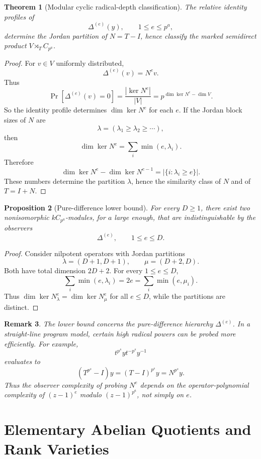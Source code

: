 \documentclass[11pt]{article}
\newtheorem{theorem}{Theorem}[section]
\newtheorem{proposition}[theorem]{Proposition}
\newtheorem{remark}[theorem]{Remark}
\begin{document}
\begin{theorem}[Modular cyclic radical-depth classification]
The relative identity profiles of
\[
\Delta^{(e)}(y),
\qquad
1\le e\le p^a,
\]
determine the Jordan partition of $N=T-I$, hence classify the marked semidirect product $V\rtimes_T C_{p^a}$.
\end{theorem}

\begin{proof}
For $v\in V$ uniformly distributed,
\[
\Delta^{(e)}(v)=N^ev.
\]
Thus
\[
\Pr[\Delta^{(e)}(v)=0]
=
\frac{|\ker N^e|}{|V|}
=
p^{\dim\ker N^e-\dim V}.
\]
So the identity profile determines $\dim\ker N^e$ for each $e$. If the Jordan block sizes of $N$ are
\[
\lambda=(\lambda_1\ge \lambda_2\ge\cdots),
\]
then
\[
\dim\ker N^e=\sum_i \min(e,\lambda_i).
\]
Therefore
\[
\dim\ker N^e-\dim\ker N^{e-1}
=
|\{i:\lambda_i\ge e\}|.
\]
These numbers determine the partition $\lambda$, hence the similarity class of $N$ and of $T=I+N$.
\end{proof}

\begin{proposition}[Pure-difference lower bound]
For every $D\ge1$, there exist two nonisomorphic $kC_{p^a}$-modules, for $a$ large enough, that are indistinguishable by the observers
\[
\Delta^{(e)},\qquad 1\le e\le D.
\]
\end{proposition}

\begin{proof}
Consider nilpotent operators with Jordan partitions
\[
\lambda=(D+1,D+1),
\qquad
\mu=(D+2,D).
\]
Both have total dimension $2D+2$. For every $1\le e\le D$,
\[
\sum_i\min(e,\lambda_i)=2e=\sum_i\min(e,\mu_i).
\]
Thus $\dim\ker N_\lambda^e=\dim\ker N_\mu^e$ for all $e\le D$, while the partitions are distinct.
\end{proof}

\begin{remark}
The lower bound concerns the pure-difference hierarchy $\Delta^{(e)}$. In a straight-line program model, certain high radical powers can be probed more efficiently. For example,
\[
t^{p^s}yt^{-p^s}y^{-1}
\]
evaluates to
\[
(T^{p^s}-I)y=(T-I)^{p^s}y=N^{p^s}y.
\]
Thus the observer complexity of probing $N^e$ depends on the operator-polynomial complexity of $(z-1)^e$ modulo $(z-1)^{p^a}$, not simply on $e$.
\end{remark}

\section{Elementary Abelian Quotients and Rank Varieties}
\end{document}
